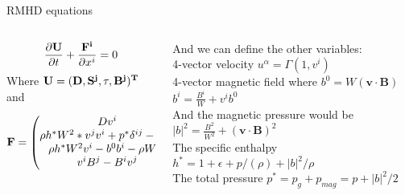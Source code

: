 \begin{frame}{RMHD equations}

\begin{columns}
\begin{column}{0.5\textwidth}
{\small
\begin{align*}
 \frac{\partial \bf{U}}{\partial t} + \frac{\bf{F^{i}}}{\partial x^{i}} = 0
\end{align*}
}
	Where $\bf{U}=(D,S^{j},\tau,B^{j})^{T}$ and

\[
\bf{F} =
\begin{pmatrix}
  Dv^{i} \\
	\rho h^{*}W^{2}*v^{j}v^{i}+p^{*}\delta^{ij} - b^{i}b^{j} \\
	\rho h^{*}W^{2}v^{i}-b^{0}b^{i} - \rho W v^{i}\\
	v^{i}B^{j}-B^{i}v^{j}\\
\end{pmatrix}
\]

\end{column}
\begin{column}{0.5\textwidth}
And we can define the other variables: \\
	4-vector velocity $u^{\alpha} = \Gamma(1,v^{i})$ \\
	4-vector magnetic field where $b^{0} = W(\mathbf{v}\cdot\mathbf{B})$ \\
	$b^{i} = \frac{B^{i}}{W} + v^{i}b^{0}$ \\
	And the magnetic pressure would be $|b|^{2} = \frac{B^{2}}{W^{2}} + (\mathbf{v}\cdot\mathbf{B})^{2}$ \\
	The specific enthalpy $h^{*}=1+\epsilon+p/(\rho)+|b|^{2}/\rho$ \\
	The total pressure $p^{*} = p_g + p_{mag} = p + |b|^{2}/2$ \\
	
\end{column}
\end{columns}


\end{frame}
